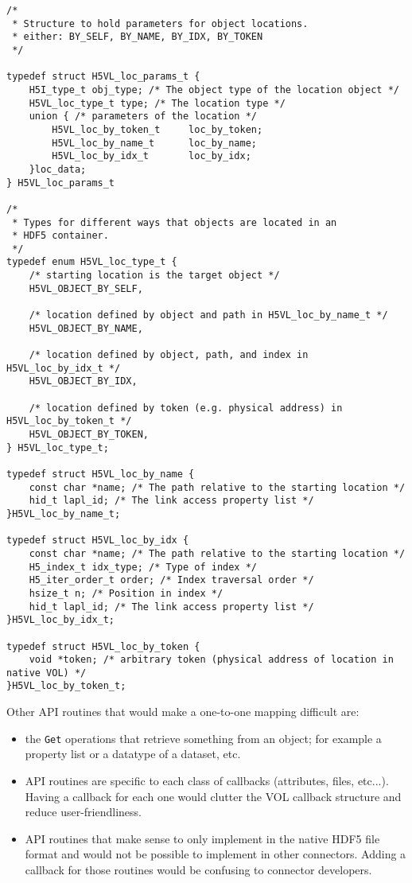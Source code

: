 \begin{lstlisting}[caption={Structure to hold parameters for object locations, H5VLpublic.h}, captionpos=b, label={lst:ObjLocclass}]
/* 
 * Structure to hold parameters for object locations.
 * either: BY_SELF, BY_NAME, BY_IDX, BY_TOKEN
 */

typedef struct H5VL_loc_params_t {
    H5I_type_t obj_type; /* The object type of the location object */
    H5VL_loc_type_t type; /* The location type */
    union { /* parameters of the location */
        H5VL_loc_by_token_t     loc_by_token;                                    
        H5VL_loc_by_name_t      loc_by_name;                                     
        H5VL_loc_by_idx_t       loc_by_idx;  
    }loc_data;
} H5VL_loc_params_t

/* 
 * Types for different ways that objects are located in an 
 * HDF5 container.
 */
typedef enum H5VL_loc_type_t {
    /* starting location is the target object */
    H5VL_OBJECT_BY_SELF, 

    /* location defined by object and path in H5VL_loc_by_name_t */
    H5VL_OBJECT_BY_NAME, 

    /* location defined by object, path, and index in H5VL_loc_by_idx_t */
    H5VL_OBJECT_BY_IDX,

    /* location defined by token (e.g. physical address) in H5VL_loc_by_token_t */
    H5VL_OBJECT_BY_TOKEN,
} H5VL_loc_type_t;

typedef struct H5VL_loc_by_name {
    const char *name; /* The path relative to the starting location */
    hid_t lapl_id; /* The link access property list */
}H5VL_loc_by_name_t;

typedef struct H5VL_loc_by_idx {
    const char *name; /* The path relative to the starting location */
    H5_index_t idx_type; /* Type of index */
    H5_iter_order_t order; /* Index traversal order */
    hsize_t n; /* Position in index */
    hid_t lapl_id; /* The link access property list */
}H5VL_loc_by_idx_t;

typedef struct H5VL_loc_by_token {
    void *token; /* arbitrary token (physical address of location in native VOL) */
}H5VL_loc_by_token_t;
\end{lstlisting}

\newpage

Other API routines that would make a one-to-one mapping difficult are:
\begin{itemize} 
\item the \texttt{Get} operations that retrieve something from an object; for example a property list or a datatype of a dataset, etc.
\item API routines are specific to each class of callbacks (attributes, files, etc...). Having a callback for each one would clutter the VOL callback structure and reduce user-friendliness. 
\item API routines that make sense to only implement in the native HDF5 file format and would not be possible to implement in other connectors. Adding a callback for those routines would be confusing to connector developers. 
\end{itemize}

